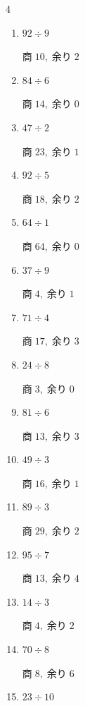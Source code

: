 \begin{multicols}{4}
\begin{enumerate}
        $商\; 10,\; 余り\; 0$

  \item $92 \div 9$

        $商\; 10,\; 余り\; 2$

  \item $84 \div 6$

        $商\; 14,\; 余り\; 0$

  \item $47 \div 2$

        $商\; 23,\; 余り\; 1$

  \item $92 \div 5$

        $商\; 18,\; 余り\; 2$

  \item $64 \div 1$

        $商\; 64,\; 余り\; 0$

  \item $37 \div 9$

        $商\; 4,\; 余り\; 1$

\columnbreak %

  \item $71 \div 4$

        $商\; 17,\; 余り\; 3$

  \item $24 \div 8$

        $商\; 3,\; 余り\; 0$

  \item $81 \div 6$

        $商\; 13,\; 余り\; 3$

  \item $49 \div 3$

        $商\; 16,\; 余り\; 1$

  \item $89 \div 3$

        $商\; 29,\; 余り\; 2$

  \item $95 \div 7$

        $商\; 13,\; 余り\; 4$

  \item $14 \div 3$

        $商\; 4,\; 余り\; 2$

  \item $70 \div 8$

        $商\; 8,\; 余り\; 6$

  \item $23 \div 10$


\end{enumerate}
\end{multicols}
